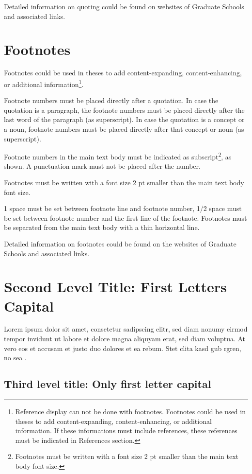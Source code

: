 Detailed information on quoting could be found on websites of Graduate Schools and associated links.

\section{Footnotes}

Footnotes could be used in theses to add content-expanding, content-enhancing, or additional information\footnote{Reference display can not be done with footnotes. Footnotes could be used in theses to add content-expanding, content-enhancing, or additional information. If these informations must include references, these references must be indicated in References section.}. 

Footnote numbers must be placed directly after a quotation. In case the quotation is a paragraph, the footnote numbers must be placed directly after the last word of the paragraph (as superscript). In case the quotation is a concept or a noun, footnote numbers must be placed directly after that concept or noun (as superscript). 

Footnote numbers in the main text body must be indicated as subscript\footnote{Footnotes must be written with a font size 2 pt smaller than the main text body font size.}, as shown. A punctuation mark must not be placed after the number.

Footnotes must be written with a font size 2 pt smaller than the main text body font size. 

1 space must be set between footnote line and footnote number, 1/2 space must be set between footnote number and the first line of the footnote. Footnotes must be separated from the main text body with a thin horizontal line. 

Detailed information on footnotes could be found on the websites of Graduate Schools and associated links.

\section{Second Level Title: First Letters Capital}

Lorem ipsum dolor sit amet, consetetur sadipscing elitr, sed diam nonumy eirmod tempor invidunt ut labore et dolore magna aliquyam erat, sed diam voluptua. At vero eos et accusam et justo duo dolores et ea rebum. Stet clita kasd gub rgren, no sea \parencite{Zuckerman199486}.

\subsection{Third level title: Only first letter capital}

